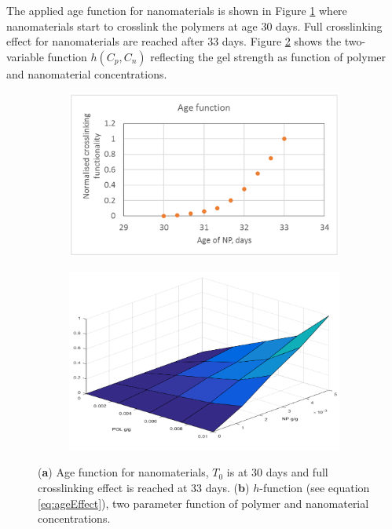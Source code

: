 \documentclass[energies,article,submit,moreauthors,pdftex]{Definitions/mdpi}
\begin{document}
The applied age function for nanomaterials is shown in Figure \ref{cht:ageFunc} where nanomaterials start to crosslink the polymers at age 30 days. Full crosslinking effect for nanomaterials are reached after 33 days. Figure \ref{cht:hFunc} shows the two-variable function $h(C_p,C_n)$  reflecting the gel strength as function of polymer and nanomaterial concentrations.      

\begin{figure}[h!] %
    \centering
    \begin{subfigure}[b]{.49\textwidth}
    \includegraphics[width=\textwidth]{fig/ageFunc.png}
    \caption{}
    \label{cht:ageFunc}
    \end{subfigure}
    \begin{subfigure}[b]{.49\textwidth}
    \includegraphics[width=\textwidth]{fig/hFunc.png}
    \caption{}
    \label{cht:hFunc}
    \end{subfigure}
    
    \caption{(\textbf{a}) Age function for nanomaterials, $T_0$ is at 30 days and full crosslinking effect is reached at 33 days. (\textbf{b}) $h$-function (see equation \ref{eq:ageEffect}), two parameter function of polymer and nanomaterial concentrations. }
    \label{cht:ageAndH}
\end{figure}
\end{document}
